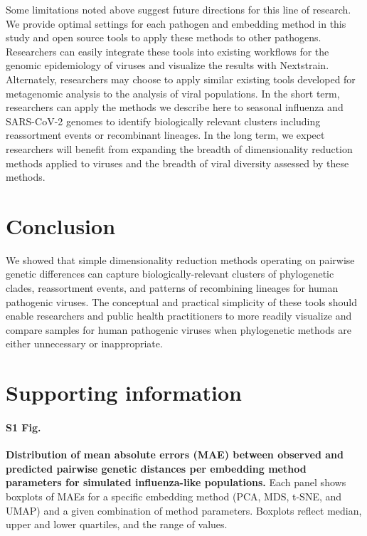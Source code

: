 \documentclass[10pt,letterpaper]{article}
\begin{document}
Some limitations noted above suggest future directions for this line of research.
We provide optimal settings for each pathogen and embedding method in this study and open source tools to apply these methods to other pathogens.
Researchers can easily integrate these tools into existing workflows for the genomic epidemiology of viruses and visualize the results with Nextstrain.
Alternately, researchers may choose to apply similar existing tools developed for metagenomic analysis \cite{Schloss2009,Schloss2020,Bolyen2019,McMurdie2013} to the analysis of viral populations.
In the short term, researchers can apply the methods we describe here to seasonal influenza and SARS-CoV-2 genomes to identify biologically relevant clusters including reassortment events or recombinant lineages.
In the long term, we expect researchers will benefit from expanding the breadth of dimensionality reduction methods applied to viruses and the breadth of viral diversity assessed by these methods.

\section*{Conclusion}

We showed that simple dimensionality reduction methods operating on pairwise genetic differences can capture biologically-relevant clusters of phylogenetic clades, reassortment events, and patterns of recombining lineages for human pathogenic viruses.
The conceptual and practical simplicity of these tools should enable researchers and public health practitioners to more readily visualize and compare samples for human pathogenic viruses when phylogenetic methods are either unnecessary or inappropriate.

\section*{Supporting information}

\paragraph*{S1 Fig.}
\label{S_Fig_simulated_flu_errors}
{\bf Distribution of mean absolute errors (MAE) between observed and predicted pairwise genetic distances per embedding method parameters for simulated influenza-like populations.} Each panel shows boxplots of MAEs for a specific embedding method (PCA, MDS, t-SNE, and UMAP) and a given combination of method parameters. Boxplots reflect median, upper and lower quartiles, and the range of values.
\end{document}
